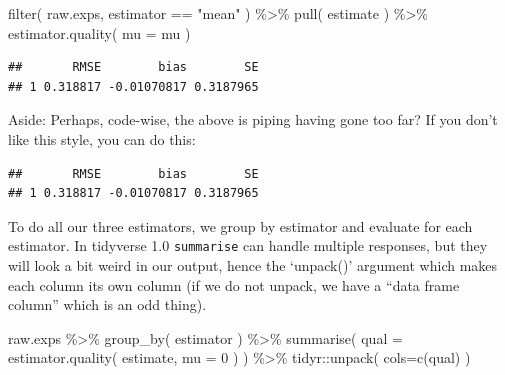 \documentclass[
]{book}
\newenvironment{Shaded}{\begin{snugshade}}{\end{snugshade}}
\newcommand{\AttributeTok}[1]{\textcolor[rgb]{0.77,0.63,0.00}{#1}}
\newcommand{\DecValTok}[1]{\textcolor[rgb]{0.00,0.00,0.81}{#1}}
\newcommand{\FunctionTok}[1]{\textcolor[rgb]{0.00,0.00,0.00}{#1}}
\newcommand{\NormalTok}[1]{#1}
\newcommand{\SpecialCharTok}[1]{\textcolor[rgb]{0.00,0.00,0.00}{#1}}
\newcommand{\StringTok}[1]{\textcolor[rgb]{0.31,0.60,0.02}{#1}}
\begin{document}
\begin{Shaded}
\begin{Highlighting}[]
\FunctionTok{filter}\NormalTok{( raw.exps, estimator }\SpecialCharTok{==} \StringTok{"mean"}\NormalTok{ ) }\SpecialCharTok{\%\textgreater{}\%}
    \FunctionTok{pull}\NormalTok{( estimate ) }\SpecialCharTok{\%\textgreater{}\%}
    \FunctionTok{estimator.quality}\NormalTok{( }\AttributeTok{mu =}\NormalTok{ mu )}
\end{Highlighting}
\end{Shaded}

\begin{verbatim}
##       RMSE        bias        SE
## 1 0.318817 -0.01070817 0.3187965
\end{verbatim}

Aside: Perhaps, code-wise, the above is piping having gone too far? If you don't like this style, you can do
this:

\begin{Shaded}
\end{Shaded}

\begin{verbatim}
##       RMSE        bias        SE
## 1 0.318817 -0.01070817 0.3187965
\end{verbatim}

To do all our three estimators, we group by estimator and evaluate for each
estimator. In tidyverse 1.0 \texttt{summarise} can handle multiple responses, but they
will look a bit weird in our output, hence the `unpack()' argument which
makes each column its own column (if we do not unpack, we have a ``data frame
column'' which is an odd thing).

\begin{Shaded}
\begin{Highlighting}[]
\NormalTok{raw.exps }\SpecialCharTok{\%\textgreater{}\%}
    \FunctionTok{group\_by}\NormalTok{( estimator ) }\SpecialCharTok{\%\textgreater{}\%}
    \FunctionTok{summarise}\NormalTok{( }\AttributeTok{qual =} \FunctionTok{estimator.quality}\NormalTok{( estimate, }\AttributeTok{mu =} \DecValTok{0}\NormalTok{ ) ) }\SpecialCharTok{\%\textgreater{}\%}
\NormalTok{    tidyr}\SpecialCharTok{::}\FunctionTok{unpack}\NormalTok{( }\AttributeTok{cols=}\FunctionTok{c}\NormalTok{(qual) )}
\end{Highlighting}
\end{Shaded}
\end{document}
